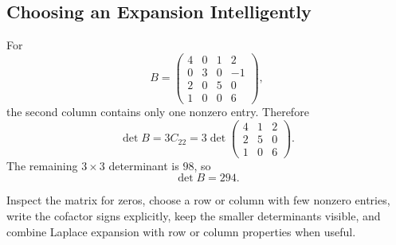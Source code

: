 \subsection{Choosing an Expansion Intelligently}

\begin{examplebox}
For
\[
B=\begin{pmatrix}
4&0&1&2\\
0&3&0&-1\\
2&0&5&0\\
1&0&0&6
\end{pmatrix},
\]
the second column contains only one nonzero entry. Therefore
\[
\det B=3C_{22}
=3\det\begin{pmatrix}
4&1&2\\2&5&0\\1&0&6
\end{pmatrix}.
\]
The remaining $3\times3$ determinant is $98$, so
\[
\det B=294.
\]
\end{examplebox}

\begin{corebox}
Inspect the matrix for zeros, choose a row or column with few nonzero entries, write the cofactor signs explicitly, keep the smaller determinants visible, and combine Laplace expansion with row or column properties when useful.
\end{corebox}
